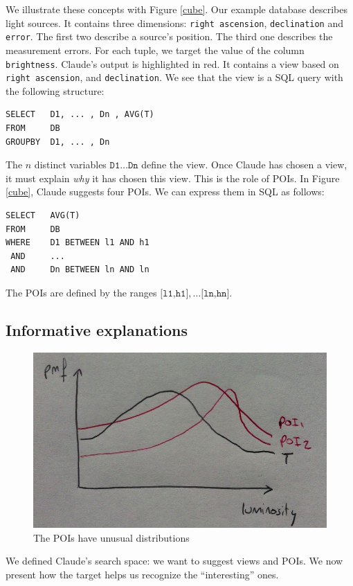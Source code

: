 We illustrate these concepts with Figure \ref{cube}. Our example database
describes light sources.  It contains three dimensions: \texttt{right
ascension}, \texttt{declination} and \texttt{error}. The first two describe a
source's position. The third one describes the measurement errors. For each
tuple, we target the value of the column \texttt{brightness}. Claude's output
is highlighted in red. It contains a view based on \texttt{right ascension},
and \texttt{declination}. We see that the view is a SQL query with the
following structure:
\begin{verbatim}
SELECT   D1, ... , Dn , AVG(T)
FROM     DB 
GROUPBY  D1, ... , Dn
\end{verbatim}
The $n$ distinct variables $\texttt{D1} \ldots \texttt{Dn}$ define the view. Once
Claude has chosen a view, it must explain \emph{why} it has chosen this view.
This is the role of POIs. In Figure \ref{cube}, Claude suggests four POIs. We
can express them in SQL as follows:
\begin{verbatim}
SELECT   AVG(T)
FROM     DB
WHERE    D1 BETWEEN l1 AND h1
 AND     ...
 AND     Dn BETWEEN ln AND ln
\end{verbatim}
The POIs are defined by the ranges $\texttt{[l1,h1]}, \dots \texttt{[ln,hn]}$.


\subsection{Informative explanations}
\label{sec:infor}
\begin{figure}[t!]
\centering
\includegraphics[width=\columnwidth]{images/poi}
\caption{The POIs have unusual distributions}
\label{poi}
\end{figure}

We defined Claude's search space: we want to suggest views and POIs. We now
present how the target helps us recognize the ``interesting'' ones. 

